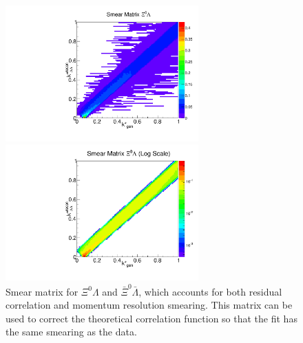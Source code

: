 \begin{figure}[ht]
\begin{minipage}{17.5pc}
\includegraphics[width=17.5pc]{Figures/SmearMatrices/2016-7-19-SmearMatrixXi0LambdaNormLLAA.pdf}
\end{minipage}\hspace{0.5pc}
\begin{minipage}{17.5pc}
\includegraphics[width=17.5pc]{Figures/SmearMatrices/2016-7-19-SmearMatrixXi0LambdaNormLLAALog.pdf}
\end{minipage} 
\caption[Smear matrix -- $\Xi^0\Lambda$ and $\bar{\Xi}^0\bar{\Lambda}$]{
Smear matrix for $\Xi^0\Lambda$ and $\bar{\Xi}^0\bar{\Lambda}$, which accounts for both residual correlation and momentum resolution smearing. This matrix can be used to correct the theoretical correlation function so that the fit has the same smearing as the data.
}
\end{figure}

